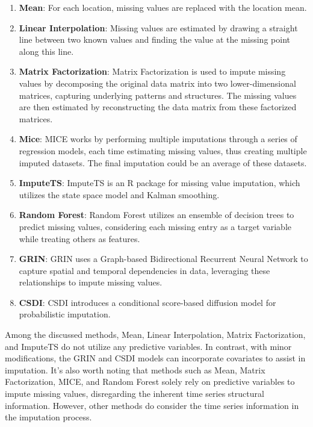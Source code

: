 \documentclass[11pt]{article}
\begin{document}
\begin{enumerate}
	\item \textbf{Mean}: For each location, missing values are replaced with the location mean.
	\item \textbf{Linear Interpolation}: Missing values are estimated by drawing a straight line between two known values and finding the value at the missing point along this line.
	\item \textbf{Matrix Factorization}: Matrix Factorization is used to impute missing values by decomposing the original data matrix into two lower-dimensional matrices, capturing underlying patterns and structures. The missing values are then estimated by reconstructing the data matrix from these factorized matrices.
	\item \textbf{Mice}: MICE \citep{white2011multiple} works by performing multiple imputations through a series of regression models, each time estimating missing values, thus creating multiple imputed datasets. The final imputation could be an average of these datasets.
	\item \textbf{ImputeTS}:  ImputeTS \citep{moritz2017imputets} is an R package for missing value imputation, which utilizes the state space model and Kalman smoothing.
	\item \textbf{Random Forest}: Random Forest \citep{breiman2001random} utilizes an ensemble of decision trees to predict missing values, considering each missing entry as a target variable while treating others as features.
	\item \textbf{GRIN}: GRIN \citep{cini2021filling} uses a Graph-based Bidirectional Recurrent Neural Network to capture spatial and temporal dependencies in data, leveraging these relationships to impute missing values.
	\item \textbf{CSDI}: CSDI \citep{tashiro2021csdi} introduces a conditional score-based diffusion model for probabilistic imputation.
\end{enumerate}


Among the discussed methods, Mean, Linear Interpolation, Matrix Factorization, and ImputeTS do not utilize any predictive variables. In contrast, with minor modifications, the GRIN and CSDI models can incorporate covariates to assist in imputation. It's also worth noting that methods such as Mean, Matrix Factorization, MICE, and Random Forest solely rely on predictive variables to impute missing values, disregarding the inherent time series structural information. However, other methods do consider the time series information in the imputation process.
\end{document}
